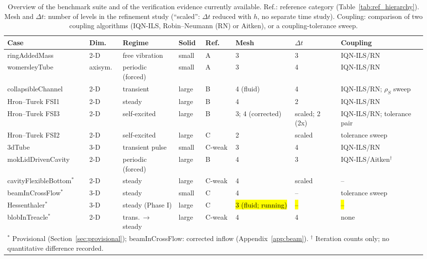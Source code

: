 \begin{table}[htbp]
	\centering
	\footnotesize
	\setlength{\tabcolsep}{3pt}
	\caption{Overview of the benchmark suite and of the verification evidence currently available. Ref.: reference category (Table~\ref{tab:ref_hierarchy}). Mesh and $\Delta t$: number of levels in the refinement study (``scaled'': $\Delta t$ reduced with $h$, no separate time study). Coupling: comparison of two coupling algorithms (IQN-ILS, Robin--Neumann (RN) or Aitken), or a coupling-tolerance sweep.}
	\label{tab:suite_overview}
	\begin{tabular}{llllllll}
		\toprule
		Case & Dim. & Regime & Solid & Ref. & Mesh & $\Delta t$ & Coupling \\
		\midrule
		ringAddedMass & 2-D & free vibration & small & A & 3 & 3 & IQN-ILS/RN \\
		womersleyTube & axisym. & periodic (forced) & small & A & 3 & 4 & IQN-ILS/RN \\
		collapsibleChannel & 2-D & transient & large & B & 4 (fluid) & 4 & IQN-ILS/RN; $\rho_S$ sweep \\
		Hron--Turek FSI1 & 2-D & steady & large & B & 4 & 2 & IQN-ILS/RN \\
		Hron--Turek FSI3 & 2-D & self-excited & large & B & 3; 4 (corrected) & scaled; 2 (2x) & IQN-ILS/RN; tolerance pair \\
		Hron--Turek FSI2 & 2-D & self-excited & large & C & 2 & scaled & tolerance sweep \\
		3dTube & 3-D & transient pulse & small & C-weak & 3 & 4 & IQN-ILS/RN \\
		mokLidDrivenCavity & 2-D & periodic (forced) & large & B & 4 & 3 & IQN-ILS/Aitken$^\dagger$ \\
		cavityFlexibleBottom$^\ast$ & 2-D & steady & large & C-weak & 4 & scaled & -- \\
		beamInCrossFlow$^\ast$ & 3-D & steady & small & C & 4 & -- & tolerance sweep \\
		Hessenthaler$^\ast$ & 3-D & steady (Phase I) & large & C & \hl{3 (fluid; running)} & \hl{--} & \hl{--} \\
		blobInTreacle$^\ast$ & 2-D & trans.\,$\to$\,steady & large & C-weak & 4 & 4 & none \\
		\bottomrule
		\multicolumn{8}{l}{$^\ast$ Provisional (Section~\ref{sec:provisional}); beamInCrossFlow: corrected inflow (Appendix~\ref{app:beam}). $^\dagger$ Iteration counts only; no quantitative difference recorded.}
	\end{tabular}
\end{table}

